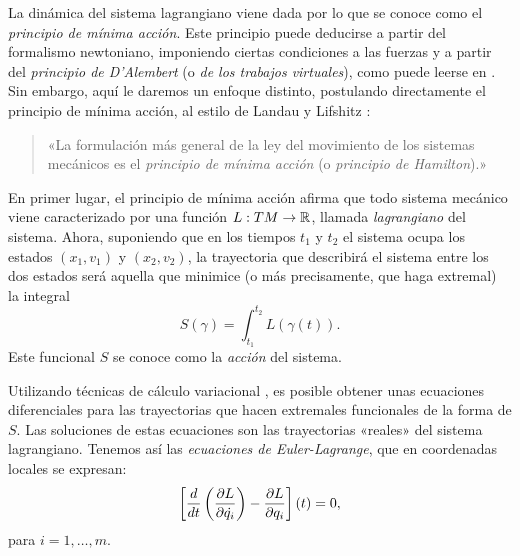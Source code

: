 La dinámica del sistema lagrangiano viene dada por lo que se conoce como el \emph{principio de mínima acción}. Este principio puede deducirse a partir del formalismo newtoniano, imponiendo ciertas condiciones a las fuerzas y a partir del \emph{principio de D'Alembert} (o \emph{de los trabajos virtuales}), como puede leerse en \cite{goldstein}. Sin embargo, aquí le daremos un enfoque distinto, postulando directamente el principio de mínima acción, al estilo de Landau y Lifshitz \cite{landau}:
  \begin{quote}
    «La formulación más general de la ley del movimiento de los sistemas mecánicos es el \emph{principio de mínima acción} (o \emph{principio de Hamilton}).»
  \end{quote}

  En primer lugar, el principio de mínima acción afirma que todo sistema mecánico viene caracterizado por una función $L: TM \rightarrow \mathbb{R}$, llamada \emph{lagrangiano} del sistema. Ahora, suponiendo que en los tiempos $t_1$ y $t_2$ el sistema ocupa los estados $(x_1,v_1)$ y $(x_2,v_2)$, la trayectoria que describirá el sistema entre los dos estados será aquella que minimice (o más precisamente, que haga extremal) la integral
  \begin{equation}\label{accion}
    S(\gamma) = \int_{t_1}^{t_2} L(\gamma(t)).
  \end{equation}
  Este funcional $S$ se conoce como la \emph{acción} del sistema.

  Utilizando técnicas de cálculo variacional \cite{arnold}, es posible obtener unas ecuaciones diferenciales para las trayectorias que hacen extremales funcionales de la forma de $S$. Las soluciones de estas ecuaciones son las trayectorias «reales» del sistema lagrangiano. Tenemos así las \emph{ecuaciones de Euler-Lagrange}, que en coordenadas locales se expresan:
  \begin{equation*}
    \left[\frac{d}{dt}\left( \frac{\partial L}{\partial \dot{q_i}} \right)- \frac{\partial L}{\partial q_i}\right](t) = 0,    
  \end{equation*}
  para $i=1,\dots,m$.

